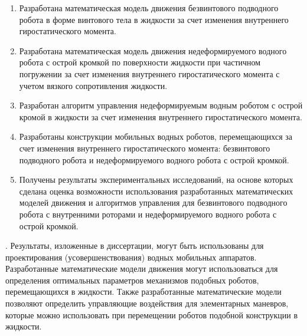 {\novelty}
\begin{enumerate}
  \item Разработана математическая модель движения безвинтового подводного робота в форме винтового тела в жидкости за счет изменения внутреннего гиростатического момента.
  \item Разработана математическая модель движения недеформируемого водного робота с острой кромкой по поверхности жидкости при частичном погружении за счет изменения внутреннего гиростатического момента с учетом вязкого сопротивления жидкости.
  \item Разработан алгоритм управления недеформируемым водным роботом с острой кромой в жидкости за счет изменения внутреннего гиростатического момента.
  \item Разработаны конструкции мобильных водных роботов, перемещающихся за счет изменения внутреннего гиростатического момента: безвинтового подводного робота и недеформируемого водного робота с острой кромкой.
  \item Получены результаты экспериментальных исследований, на основе которых сделана оценка возможности использования разработанных математических моделей движения и алгоритмов управления для безвинтового подводного робота с внутренними роторами и недеформируемого водного робота с острой кромкой.
\end{enumerate}

{\influence}. Результаты, изложенные в диссертации, могут быть использованы для проектирования (усовершенствования) водных мобильных аппаратов. Разработанные математические модели движения могут использоваться для определения оптимальных параметров механизмов подобных роботов, перемещающихся в жидкости. Также разработанные математические модели позволяют определить управляющие воздействия для элементарных маневров, которые можно использовать при перемещении роботов подобной конструкции в жидкости.


